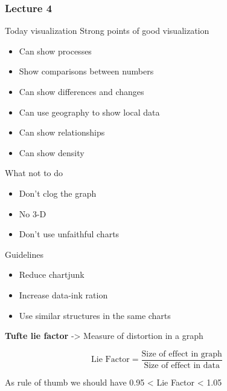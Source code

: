 \subsubsection{Lecture 4}

Today visualization
\vspace{10pt}
Strong points of good visualization

\begin{itemize}
    \item Can show processes
    \item Show comparisons between numbers
    \item Can show differences and changes
    \item Can use geography to show local data
    \item Can show relationships
    \item Can show density
\end{itemize}

\vspace{10pt}

What not to do

\begin{itemize}
    \item Don't clog the graph
    \item No 3-D
    \item Don't use unfaithful charts
\end{itemize}

\vspace{10pt}

Guidelines

\begin{itemize}
    \item Reduce chartjunk
    \item Increase data-ink ration
    \item Use similar structures in the same charts
\end{itemize}

\vspace{10pt}

\textbf{Tufte lie factor} -> Measure of distortion in a graph

\begin{equation}
    \text{Lie Factor} = 
    \frac{\text{Size of effect in graph}}
         {\text{Size of effect in data}}
\end{equation}

\vspace{10pt}

As rule of thumb we should have 0.95 < Lie Factor < 1.05

